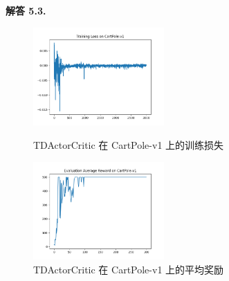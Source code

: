 \documentclass[12pt, a4paper, oneside]{ctexart}
\newenvironment{solution}[1]{\par\noindent\textbf{解答 #1. }\par}{\par}
\begin{document}
\begin{solution}{5.3}
\begin{figure}[htbp]
        \centering
        \begin{minipage}[t]{0.48\textwidth}
        \centering
        \includegraphics[width=5cm]{../code/policy_gradient/figs/Training Loss on CartPole-v1 with algorithm TDActorCritic .png}
        \caption{TDActorCritic 在 CartPole-v1 上的训练损失}
        \end{minipage}
        \begin{minipage}[t]{0.48\textwidth}
        \centering
        \includegraphics[width=5cm]{../code/policy_gradient/figs/Evaluation Average Reward on CartPole-v1 with algorithm TDActorCritic.png}
        \caption{TDActorCritic 在 CartPole-v1 上的平均奖励}
        \end{minipage}

    \end{figure}

    \begin{figure}[htbp]


\end{figure}
\end{solution}
\end{document}
